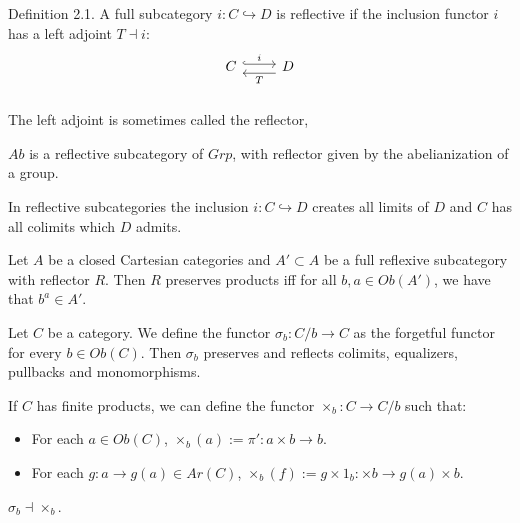 \begin{definition}
  Definition 2.1. A full subcategory $i:C\hookrightarrow D$ is reflective if the inclusion functor $i$ has a left adjoint $T\dashv i$:
  \[
    \begin{tikzcd}
      C\arrow[hookrightarrow, shift left=.5ex, "i"{name=T}]{r}{} &
      D\arrow[ shift left=1ex, "T"{name=i}]{l}{} \\
    \end{tikzcd}
  \]
  The left adjoint is sometimes called the reflector,
\end{definition}

\begin{example}
  $Ab$ is a reflective subcategory of $Grp$, with reflector given by the abelianization of a group.
\end{example}


\begin{proposition}
  In reflective subcategories the inclusion $i:C\hookrightarrow D$ creates all limits of $D$ and $C$ has all colimits which $D$ admits.
\end{proposition}


\begin{theorem}
  Let $A$ be a closed Cartesian categories and $A'\subset A$ be a full reflexive subcategory with reflector  $R$. Then $R$ preserves products iff for all $b,a\in Ob(A')$, we have that $b^a\in A'$.
\end{theorem}
\begin{corollary}
  Let $C$ be a category. We define the functor $\sigma_b : C/b \to C$ as the forgetful functor for every $b\in Ob(C)$. Then $\sigma_b$ preserves and reflects colimits, equalizers, pullbacks and monomorphisms.
\end{corollary}

If $C$ has finite products, we can define the functor $\times_b: C \to C/b$ such that:
\begin{itemize}
\item For each $a\in Ob(C)$, $\times_b(a) := \pi':a\times b \to b$.
\item For each $g:a\to g(a)\in Ar(C)$, $\times_b(f) := g\times 1_{b}: \times b \to g(a)\times b$.
\end{itemize}

\begin{proposition}
  $\sigma_b \dashv \times_b$.\\
\end{proposition}

